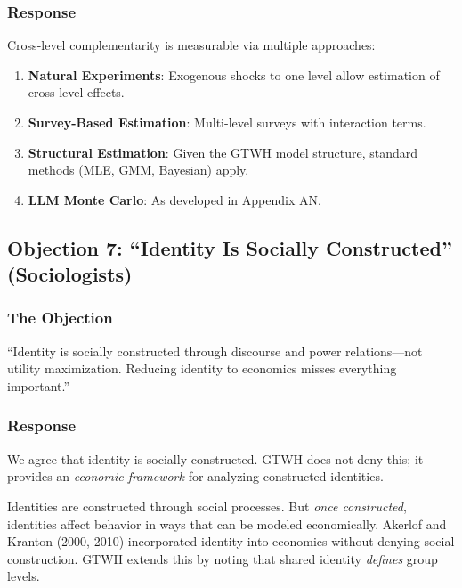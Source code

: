 \subsubsection{Response}

Cross-level complementarity is measurable via multiple approaches:

\begin{enumerate}
\item \textbf{Natural Experiments}: Exogenous shocks to one level allow estimation 
of cross-level effects.
\item \textbf{Survey-Based Estimation}: Multi-level surveys with interaction terms.
\item \textbf{Structural Estimation}: Given the GTWH model structure, standard 
methods (MLE, GMM, Bayesian) apply.
\item \textbf{LLM Monte Carlo}: As developed in Appendix AN.
\end{enumerate}

\subsection{Objection 7: ``Identity Is Socially Constructed'' (Sociologists)}

\subsubsection{The Objection}

\begin{tcolorbox}[colback=red!5!white, colframe=red!75!black, title=Sociologist's Objection]
``Identity is socially constructed through discourse and power relations---not 
utility maximization. Reducing identity to economics misses everything important.''
\end{tcolorbox}

\subsubsection{Response}

We agree that identity is socially constructed. GTWH does not deny this; it 
provides an \textit{economic framework} for analyzing constructed identities.

Identities are constructed through social processes. But \textit{once constructed}, 
identities affect behavior in ways that can be modeled economically. Akerlof and 
Kranton (2000, 2010) incorporated identity into economics without denying social 
construction. GTWH extends this by noting that shared identity \textit{defines} 
group levels.


